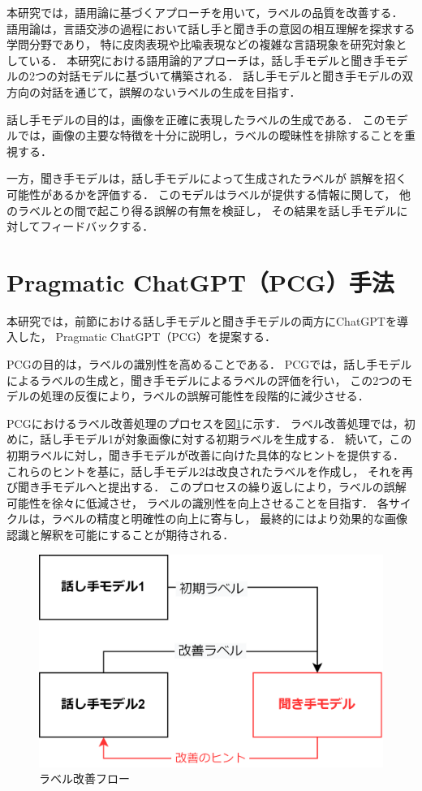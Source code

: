 \documentclass[a4paper,11pt]{jreport}
\begin{document}
本研究では，語用論に基づくアプローチを用いて，ラベルの品質を改善する．
語用論は，言語交渉の過程において話し手と聞き手の意図の相互理解を探求する学問分野であり，
特に皮肉表現や比喩表現などの複雑な言語現象を研究対象としている．
本研究における語用論的アプローチは，話し手モデルと聞き手モデルの2つの対話モデルに基づいて構築される．
話し手モデルと聞き手モデルの双方向の対話を通じて，誤解のないラベルの生成を目指す．

話し手モデルの目的は，画像を正確に表現したラベルの生成である．
このモデルでは，画像の主要な特徴を十分に説明し，ラベルの曖昧性を排除することを重視する．

一方，聞き手モデルは，話し手モデルによって生成されたラベルが
誤解を招く可能性があるかを評価する．
このモデルはラベルが提供する情報に関して，
他のラベルとの間で起こり得る誤解の有無を検証し，
その結果を話し手モデルに対してフィードバックする．

\section{Pragmatic ChatGPT（PCG）手法}
本研究では，前節における話し手モデルと聞き手モデルの両方にChatGPTを導入した，
Pragmatic ChatGPT（PCG）を提案する．

PCGの目的は，ラベルの識別性を高めることである．
PCGでは，話し手モデルによるラベルの生成と，聞き手モデルによるラベルの評価を行い，
この2つのモデルの処理の反復により，ラベルの誤解可能性を段階的に減少させる．

PCGにおけるラベル改善処理のプロセスを図\ref{fig:PCGflow}に示す．
ラベル改善処理では，初めに，話し手モデル1が対象画像に対する初期ラベルを生成する．
続いて，この初期ラベルに対し，聞き手モデルが改善に向けた具体的なヒントを提供する．
これらのヒントを基に，話し手モデル2は改良されたラベルを作成し，
それを再び聞き手モデルへと提出する．
このプロセスの繰り返しにより，ラベルの誤解可能性を徐々に低減させ，
ラベルの識別性を向上させることを目指す．
各サイクルは，ラベルの精度と明確性の向上に寄与し，
最終的にはより効果的な画像認識と解釈を可能にすることが期待される．

\begin{figure}[H]
	\centering
	\includegraphics[width=0.8\linewidth]{figures/PCGflow.png}
	\caption{ラベル改善フロー}
	\label{fig:PCGflow}
\end{figure}
\end{document}
